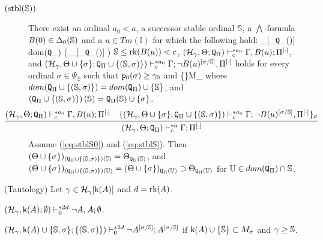 \documentclass{article}
\newcommand{\mS}{\mathbb{S}}
\newcommand{\mI}{\mathbb{I}}
\newcommand{\mU}{\mathbb{U}}
\begin{document}
{\begin{description}
\item[$({\rm stbl}(\mS))$]
There exist an ordinal $a_{0}<a$,
a successor stable ordinal $\mS$,
a $\bigwedge$-formula 
$B(0)\in\Del_{0}(\mS)$ 
and a $u\in Tm(\mI)$ 
for which the following hold:
\beqn\label{eq:stblS0}
\mS\in\calh_{\gam}[\Tht_{{\tt Q}_{\Pi}(\mS)}] \spand
\fal\mU\in dom({\tt Q}_{\Pi})\cap\mS
\left(
\mS\in\calh_{\gam}[\Tht_{{\tt Q}_{\Pi}(\mU)}]
\right)
\eeqn
$
\mS\leq\rk(B(u))<c
$,
$(\mathcal{H}_{\gamma},\Theta;{\tt Q}_{\Pi}
)\vdash^{* a_{0}}_{c}
\Gamma, B(u);\Pi^{[\cdot]}$, and 
$(\mathcal{H}_{\gamma},\Theta\cup\{\sig\};
{\tt Q}_{\Pi}\cup\{(\mS,\sigma)\}
)
\vdash^{* a_{0}}_{c}
\Gamma; \lnot B(u)^{[\sigma/\mathbb{S}]},\Pi^{[\cdot]}$
holds for every ordinal $\sigma\in\Psi_{\mS}$ such that
${\tt p}_{0}(\sigma)\geq\gamma_{0}$ and
\beqn\label{eq:stblS}
\Theta\cup\{\mS\}\subset M_{\sig} 
\eeqn
where
$dom({\tt Q}_{\Pi}\cup\{(\mS,\sigma)\})=dom({\tt Q}_{\Pi})\cup\{\mS\}$,
and
$\left({\tt Q}_{\Pi}\cup\{(\mS,\sig)\}\right)(\mS)={\tt Q}_{\Pi}(\mS)\cup\{\sig\}$.
{\small
\[
\hspace{-10mm}
\infer{(\mathcal{H}_{\gamma},\Theta;{\tt Q}_{\Pi})\vdash^{* a}_{c} \Gamma;\Pi^{[\cdot]}}
{
(\mathcal{H}_{\gamma},\Theta;{\tt Q}_{\Pi}
)\vdash^{* a_{0}}_{c}
\Gamma, B(u);\Pi^{[\cdot]}
&
\{
(\mathcal{H}_{\gamma},\Theta\cup\{\sig\};
{\tt Q}_{\Pi}\cup\{(\mS,\sigma)\}
)
\vdash^{* a_{0}}_{c}
\Gamma; \lnot B(u)^{[\sigma/\mathbb{S}]},\Pi^{[\cdot]}
\}_{\sig}
}
\]
}
Assume (\ref{eq:stblS0}) and (\ref{eq:stblS}). Then
$(\Tht\cup\{\sig\})_{({\tt Q}_{\Pi}\cup\{(\mS,\sig)\})(\mS)}=\Tht_{{\tt Q}_{\Pi}(\mS)}$, and
$(\Tht\cup\{\sig\})_{({\tt Q}_{\Pi}\cup\{(\mS,\sig)\})(\mU)}=
(\Tht\cup\{\sig\})_{{\tt Q}_{\Pi}(\mU)}\supset\Tht_{{\tt Q}_{\Pi}(\mU)}$
for $\mU\in dom({\tt Q}_{\Pi})\cap\mS$.

\end{description}
}
\edf






\blem\label{lem:tautology*}{\rm (Tautology)}
Let $\gamma\in{\cal H}_{\gamma}[{\sf k}(A)]$ and $d=\mbox{{\rm rk}}(A)$.
\benu
\item\label{lem:tautology*.1}
$(\mathcal{H}_{\gamma},{\sf k}(A);\emptyset
)\vdash^{* 2d}_{0}
\lnot A, A; \emptyset$.

\item\label{lem:tautology*.2}
$(\mathcal{H}_{\gamma},{\sf k}(A)\cup\{\mS,\sig\};\{(\mS,\sig)\}
)\vdash^{* 2d}_{0}
\lnot A^{[\sig/\mS]};A^{[\sig/\mS]}$ if $\sfk(A)\cup\{\mS\}\subset M_{\sig}$ and $\gam\geq\mS$.
\eenu
\end{document}
